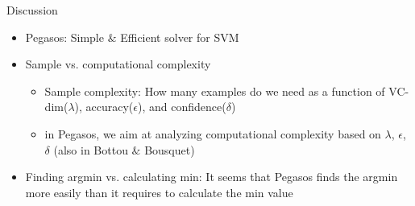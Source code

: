 \begin{frame}{Discussion}
    \begin{itemize}
        \item Pegasos: Simple $\&$ Efficient solver for SVM
        \item Sample vs. computational complexity
            \begin{itemize}
                \item Sample complexity: How many examples do we need as a function of VC-dim($\lambda$), accuracy($\epsilon$), and confidence($\delta$)
                \item in Pegasos, we aim at analyzing computational complexity based on $\lambda$, $\epsilon$, $\delta$ (also in Bottou $\&$ Bousquet)
            \end{itemize}
        \item Finding argmin vs. calculating min: It seems that Pegasos finds the argmin more easily than it requires to calculate the min value
    \end{itemize}
\end{frame}
